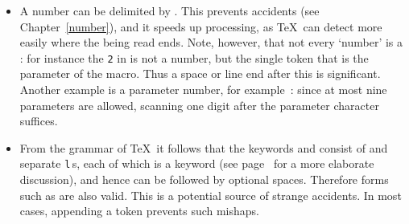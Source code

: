 \documentclass{book}
\begin{document}
\begin{itemize} 
\item A number can be delimited by . 
This prevents accidents (see Chapter~\ref{number}), 
and it speeds up processing, as \TeX\ can 
detect more easily where the  being read ends.
Note, however, that not every `number' is a :
for instance the {\tt 2} in  is not a number,
but the  single token that is the parameter of the
 macro. Thus a space or line end after this
is significant. Another example is a parameter number,
for example~: since at most nine parameters are allowed, scanning
one digit after the parameter character suffices.

\item From the grammar of \TeX\ 
it follows that the
keywords  and 
consist of  and
separate {\tt l}$\,$s, each of which is a keyword
(see page~\pageref{keywords} for a more elaborate discussion),
and hence can be followed by optional spaces. 
Therefore forms such as \hbox{} are also valid.
This is a potential source of strange accidents.
In most cases, appending a  token prevents
such mishaps.


\end{itemize}
\end{document}
